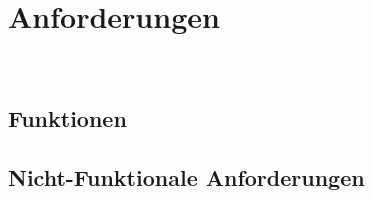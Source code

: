 %
%



%
%
\newcommand{\K}{}





%
%
%
%



\chapter{Anforderungen}
\label{AF}~\\


\section{Funktionen}
\label{AF:FA}

%
%
%




%
%
%
%
%


%
%
\clearpage


\section{Nicht-Funktionale Anforderungen}
\label{AF:NFA}~\\

%
%
%



%
%
%
%
%
%



